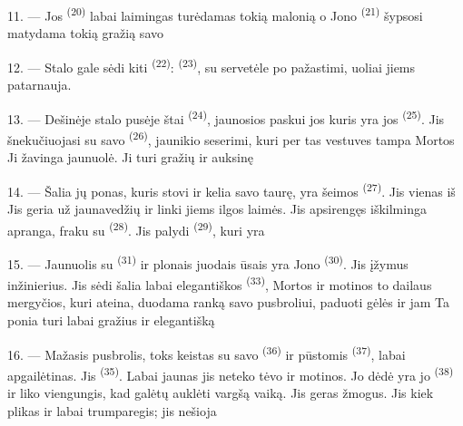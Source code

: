 11. --- Jos  \textsuperscript{(20)} labai laimingas turėdamas tokią
malonią  o Jono  \textsuperscript{(21)} šypsosi matydama
tokią gražią savo 

12. --- Stalo gale sėdi kiti  \textsuperscript{(22)}:
 
\textsuperscript{(23)}, su servetėle po pažastimi, uoliai jiems patarnauja.

\VUsaut{3.0mm}

13. --- Dešinėje stalo pusėje štai  \textsuperscript{(24)}, jaunosios
 paskui jos  kuris yra jos 
\textsuperscript{(25)}. Jis šnekučiuojasi su savo 
\textsuperscript{(26)}, jaunikio seserimi, kuri per tas vestuves tampa Mortos
 Ji žavinga jaunuolė. Ji turi gražių  ir auksinę 

14. --- Šalia jų ponas, kuris stovi ir kelia savo taurę, yra šeimos
 \textsuperscript{(27)}. Jis vienas iš 
Jis  geria už jaunavedžių  ir linki jiems ilgos
laimės. Jis apsirengęs iškilminga apranga, fraku su 
\textsuperscript{(28)}. Jis palydi  \textsuperscript{(29)}, kuri yra

15. --- Jaunuolis su  \textsuperscript{(31)} ir plonais juodais ūsais
yra Jono  \textsuperscript{(30)}. Jis įžymus inžinierius. Jis sėdi
šalia labai elegantiškos  \textsuperscript{(33)}, Mortos
 ir motinos to dailaus mergyčios, kuri ateina, duodama
ranką savo pusbroliui, paduoti gėlės ir  jam 
Ta ponia turi labai gražius  ir elegantišką 

16. --- Mažasis pusbrolis, toks keistas su savo 
\textsuperscript{(36)} ir pūstomis  \textsuperscript{(37)}, labai
apgailėtinas. Jis  \textsuperscript{(35)}. Labai jaunas jis neteko
tėvo ir motinos. Jo dėdė yra jo  \textsuperscript{(38)} ir liko
viengungis, kad galėtų auklėti vargšą vaiką. Jis geras žmogus. Jis kiek plikas ir
labai trumparegis; jis nešioja 

